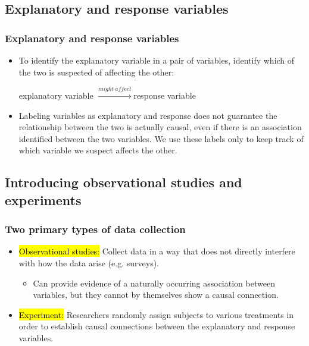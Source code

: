 \documentclass[slidestop,compress,mathserif]{beamer}
\begin{document}

\subsection{Explanatory and response variables}


\begin{frame}
\frametitle{Explanatory and response variables}

\begin{itemize}

\item To identify the explanatory variable in a pair of variables, identify which of the two is suspected of affecting the other:

\begin{center}
explanatory variable $\xrightarrow{might~affect}$response variable
\end{center}

\item Labeling variables as explanatory and response does not guarantee the relationship between the two is actually causal, even if there is an association identified between the two variables. We use these labels only to keep track of which variable we suspect affects the other.

\end{itemize}

\end{frame}


\subsection{Introducing observational studies and experiments}


\begin{frame}
\frametitle{Two primary types of data collection}

\begin{itemize}

\item \hl{Observational studies:} Collect data in a way that does not directly interfere with how the data arise (e.g. surveys).
\begin{itemize}
\item Can provide evidence of a naturally occurring association between variables, but they cannot by themselves show a causal connection.
\end{itemize}

\pause

\item \hl{Experiment:} Researchers randomly assign subjects to various treatments in order to establish causal connections between the explanatory and response variables.


\end{itemize}

\end{frame}
\end{document}
